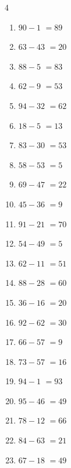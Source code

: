 \begin{multicols}{4}
\begin{enumerate}
  \item $90-1$
        $=89$

  \item $63-43$
        $=20$

\columnbreak %

\resetques

  \item $88-5$
        $=83$

  \item $62-9$
        $=53$

  \item $94-32$
        $=62$

  \item $18-5$
        $=13$

  \item $83-30$
        $=53$

  \item $58-53$
        $=5$

  \item $69-47$
        $=22$

  \item $45-36$
        $=9$

  \item $91-21$
        $=70$

  \item $54-49$
        $=5$

  \item $62-11$
        $=51$

  \item $88-28$
        $=60$

  \item $36-16$
        $=20$

  \item $92-62$
        $=30$

  \item $66-57$
        $=9$

  \item $73-57$
        $=16$

  \item $94-1$
        $=93$

  \item $95-46$
        $=49$

  \item $78-12$
        $=66$

  \item $84-63$
        $=21$

  \item $67-18$
        $=49$


\end{enumerate}
\end{multicols}
